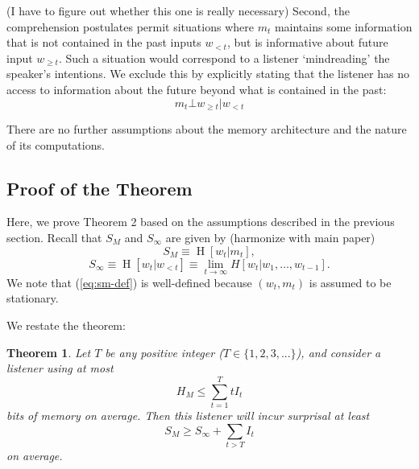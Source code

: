 \documentclass[11pt,letterpaper]{article}
\newcommand\mhahn[1]{{\color{red}(#1)}}
\newcounter{theorem}
\newtheorem{thm}[theorem]{Theorem}
\begin{document}
\mhahn{I have to figure out whether this one is really necessary}
Second, the comprehension postulates permit situations where $m_t$ maintains some information that is not contained in the past inputs $w_{<t}$, but is informative about future input $w_{\geq t}$. 
Such a situation would correspond to a listener `mindreading' the speaker's intentions.
We exclude this by explicitly stating that the listener has no access to information about the future beyond what is contained in the past:
\begin{equation}\label{eq:no-mindreading}
    m_t \bot w_{\geq t} | w_{<t}
\end{equation}


There are no further assumptions about the memory architecture and the nature of its computations.


\subsection{Proof of the Theorem}\label{sec:proof}

Here, we prove Theorem 2 based on the assumptions described in the previous section.
	Recall that $S_M$ and $S_\infty$ are given by \mhahn{harmonize with main paper}
	\begin{equation}\label{eq:sm-def}
		    S_M \equiv \operatorname{H}[w_t|m_t],
	\end{equation}
	\begin{equation}
		S_\infty \equiv \operatorname{H}[w_t|w_{<t}] \equiv \lim_{t \rightarrow \infty} H[w_t | w_1, \dots, w_{t-1}].
	\end{equation}
We note that (\ref{eq:sm-def}) is well-defined because $(w_t, m_t)$ is assumed to be stationary.

We restate the theorem:

\begin{thm}\label{prop:suboptimal}
	Let $T$ be any positive integer ($T \in \{1, 2, 3, ...\}$), and consider a listener using at most
	\begin{equation}\label{eq:memory}
H_M \leq \sum_{t=1}^T t I_t
	\end{equation}
bits of memory on average.
Then this listener will incur surprisal at least
	\begin{equation}
	S_M \geq S_\infty + \sum_{t > T} I_t
	\end{equation}
	on average.
\end{thm}
\end{document}
